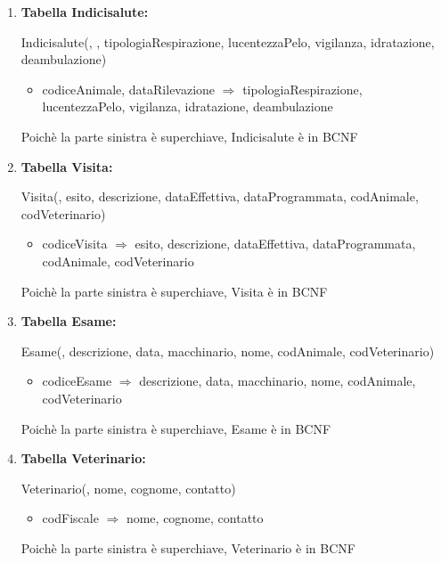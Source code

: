 \documentclass[12pt,a4paper]{article}
\begin{document}
\begin{enumerate}
\item[] \textbf{Tabella Indicisalute:}

Indicisalute(\underline{}, \underline{}, tipologiaRespirazione, lucentezzaPelo, vigilanza, idratazione, deambulazione)
\begin{itemize}
\vspace{-5pt}
\item codiceAnimale, dataRilevazione $\Rightarrow$ tipologiaRespirazione, lucentezzaPelo, vigilanza, idratazione, deambulazione
\vspace{-5pt}
\end{itemize}
Poichè la parte sinistra è superchiave, Indicisalute è in BCNF
\vspace{10pt}



\item[] \textbf{Tabella Visita:}

Visita(\underline{}, esito, descrizione, dataEffettiva, dataProgrammata,  codAnimale,  codVeterinario)
\begin{itemize}
\vspace{-5pt}
\item codiceVisita $\Rightarrow$ esito, descrizione, dataEffettiva, dataProgrammata, codAnimale, codVeterinario
\vspace{-5pt}
\end{itemize}
Poichè la parte sinistra è superchiave, Visita è in BCNF
\vspace{10pt}



\item[] \textbf{Tabella Esame:}

Esame(\underline{},  descrizione, data, macchinario, nome,  codAnimale,  codVeterinario)
\begin{itemize}
\vspace{-5pt}
\item codiceEsame $\Rightarrow$ descrizione, data, macchinario, nome, codAnimale, codVeterinario
\vspace{-5pt}
\end{itemize}
Poichè la parte sinistra è superchiave, Esame è in BCNF
\vspace{10pt}



\item[] \textbf{Tabella Veterinario:}

Veterinario(\underline{}, nome, cognome, contatto)
\begin{itemize}
\vspace{-5pt}
\item codFiscale $\Rightarrow$ nome, cognome, contatto
\vspace{-5pt}
\end{itemize}
Poichè la parte sinistra è superchiave, Veterinario è in BCNF
\vspace{10pt}




\end{enumerate}
\end{document}
